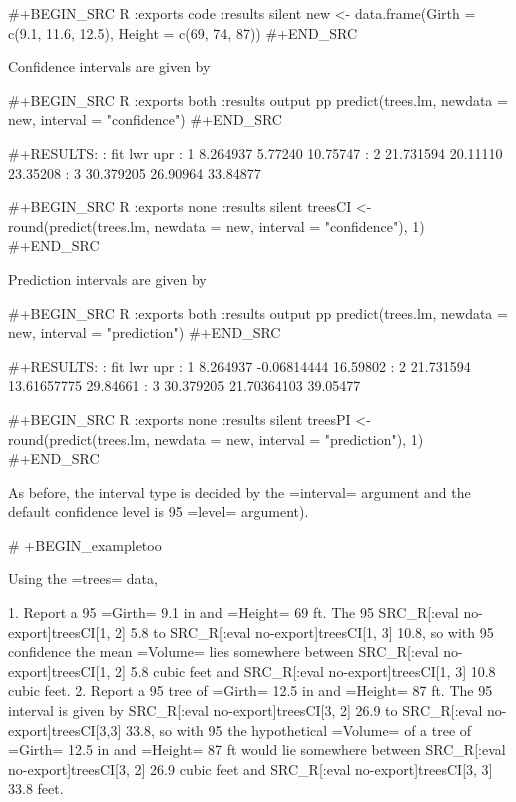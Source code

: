 #+BEGIN_SRC R :exports code :results silent 
new <- data.frame(Girth = c(9.1, 11.6, 12.5), Height = c(69, 74, 87))
#+END_SRC

Confidence intervals are given by

#+BEGIN_SRC R :exports both :results output pp 
predict(trees.lm, newdata = new, interval = "confidence")
#+END_SRC

#+RESULTS:
:         fit      lwr      upr
: 1  8.264937  5.77240 10.75747
: 2 21.731594 20.11110 23.35208
: 3 30.379205 26.90964 33.84877

#+BEGIN_SRC R :exports none :results silent
treesCI <- round(predict(trees.lm, newdata = new, interval = "confidence"), 1)
#+END_SRC

Prediction intervals are given by

#+BEGIN_SRC R :exports both :results output pp 
predict(trees.lm, newdata = new, interval = "prediction")
#+END_SRC

#+RESULTS:
:         fit         lwr      upr
: 1  8.264937 -0.06814444 16.59802
: 2 21.731594 13.61657775 29.84661
: 3 30.379205 21.70364103 39.05477

#+BEGIN_SRC R :exports none :results silent
treesPI <- round(predict(trees.lm, newdata = new, interval = "prediction"), 1)
#+END_SRC

As before, the interval type is decided by the =interval= argument and
the default confidence level is 95%
=level= argument).

# +BEGIN_exampletoo

Using the =trees= data, 

1. Report a 95%
   =Girth= 9.1 in and =Height= 69 ft. The 95%
   SRC_R[:eval no-export]{treesCI[1, 2]} 5.8 to SRC_R[:eval no-export]{treesCI[1, 3]} 10.8, so with 95%
   confidence the mean =Volume= lies somewhere between
   SRC_R[:eval no-export]{treesCI[1, 2]} 5.8 cubic feet and SRC_R[:eval no-export]{treesCI[1, 3]} 10.8 cubic feet.
2. Report a 95%
   tree of =Girth= 12.5 in and =Height= 87 ft. The 95%
   interval is given by SRC_R[:eval no-export]{treesCI[3, 2]} 26.9 to
   SRC_R[:eval no-export]{treesCI[3,3]} 33.8, so with 95%
   the hypothetical =Volume= of a tree of =Girth= 12.5 in and =Height=
   87 ft would lie somewhere between SRC_R[:eval no-export]{treesCI[3, 2]} 26.9
   cubic feet and SRC_R[:eval no-export]{treesCI[3, 3]} 33.8 feet.

